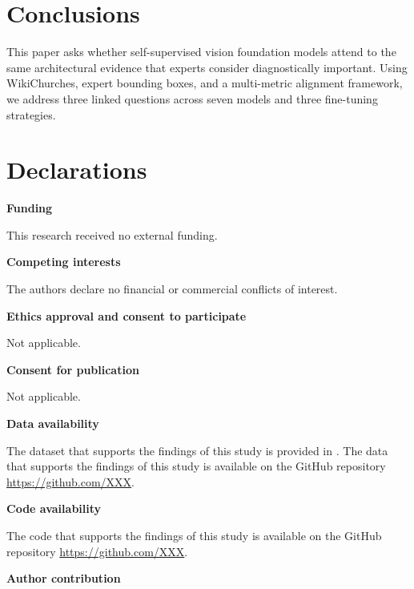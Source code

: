 \documentclass[lineno,pdflatex,sn-mathphys-num]{sn-jnl}%
\theoremstyle{thmstyleone}%
\theoremstyle{thmstyletwo}%
\theoremstyle{thmstylethree}%
\begin{document}
\section{Conclusions} \label{section conclusions}

This paper asks whether self-supervised vision foundation models attend to the same architectural evidence that experts consider diagnostically important. Using WikiChurches, expert bounding boxes, and a multi-metric alignment framework, we address three linked questions across seven models and three fine-tuning strategies.





\backmatter


\section*{Declarations}

\textbf{Funding}

This research received no external funding. \newline

\noindent\textbf{Competing interests}

The authors declare no financial or commercial conflicts of interest. \newline

\noindent\textbf{Ethics approval and consent to participate}

Not applicable.\newline

\noindent\textbf{Consent for publication}

Not applicable.\newline

\noindent\textbf{Data availability }

The dataset that supports the findings of this study is provided in \cite{Barz21WikiChurches}. The data that supports the findings of this study is available on the GitHub repository \url{https://github.com/XXX}.\newline

\noindent\textbf{Code availability }

The code that supports the findings of this study is available on the GitHub repository \url{https://github.com/XXX}.\newline

\noindent\textbf{Author contribution}

\end{document}
